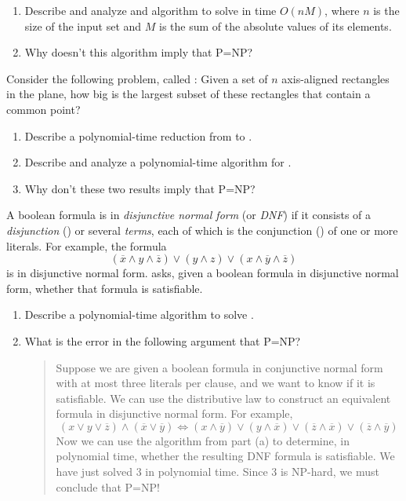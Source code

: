 \begin{exercises}
\item
\begin{enumerate}
\item Describe and analyze and algorithm to solve  in time $O(nM)$, where $n$ is the size of the input set and $M$ is the sum of the absolute values of its elements.
\item Why doesn’t this algorithm imply that P=NP?
\end{enumerate}

\item Consider the following problem, called : Given a set of $n$ axis-aligned rectangles in the plane, how big is the largest subset of these rectangles that contain a common point?
\begin{enumerate}
\item Describe a polynomial-time reduction from  to .
\item Describe and analyze a polynomial-time algorithm for .
\item Why don’t these two results imply that P=NP?
\end{enumerate}

\item A boolean formula is in \textit{disjunctive normal form} (or \textit{DNF}) if it consists of a \textit{disjunction} () or several \textit{terms}, each of which is the conjunction () of one or more literals.
For example, the formula
\[
(\overline{x} \wedge y \wedge \overline{z}) \vee (y \wedge z) \vee (x \wedge \overline{y} \wedge \overline{z})
\]
is in disjunctive normal form.
 asks, given a boolean formula in disjunctive normal form, whether that formula is satisfiable.
\begin{enumerate}
\item Describe a polynomial-time algorithm to solve .
\item What is the error in the following argument that P=NP?
\begin{quote}
\sffamily\small
Suppose we are given a boolean formula in conjunctive normal form with at most three literals per clause, and we want to know if it is satisfiable.
We can use the distributive law to construct an equivalent formula in disjunctive normal form.
For example,
\[
(x \vee y \vee \overline{z}) \wedge (\overline{x} \vee \overline{y}) \iff (x \wedge \overline{y}) \vee (y \wedge \overline{x}) \vee (\overline{z} \wedge \overline{x}) \vee (\overline{z} \wedge \overline{y})
\]
Now we can use the algorithm from part (a) to determine, in polynomial time, whether the resulting DNF formula is satisfiable.
We have just solved 3 in polynomial time.
Since 3 is NP-hard, we must conclude that P=NP!
\end{quote}
\end{enumerate}


\end{exercises}
